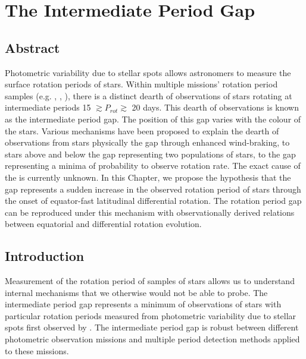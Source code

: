 \chapter{The Intermediate Period Gap}
\label{chap:period_gap}

\section*{Abstract}


Photometric variability due to stellar spots allows astronomers to measure the surface rotation periods of stars.
Within multiple missions' rotation period samples (e.g. \kepler, \ktoo, \ZTF), there is a distinct dearth of observations of stars rotating at intermediate periods 15 $\gtrsim P_{rot} \gtrsim$ 20 days.
This dearth of observations is known as the intermediate period gap.
The position of this gap varies with the colour of the stars.
Various mechanisms have been proposed to explain the dearth of observations from stars physically  the gap through enhanced wind-braking, to stars above and below the gap representing two populations of stars, to the gap representing a minima of probability to observe rotation rate.
The exact cause of the  is currently unknown.
In this Chapter, we propose the hypothesis that the gap represents a sudden increase in the observed rotation period of stars through the onset of equator-fast latitudinal differential rotation.
The rotation period gap can be reproduced under this mechanism with observationally derived relations between equatorial and differential rotation evolution.

\newpage

\section{Introduction}
\label{sec:intro}

Measurement of the rotation period of samples of stars allows us to understand internal mechanisms that we otherwise would not be able to probe.
The intermediate period gap represents a minimum of observations of stars with particular rotation periods measured from photometric variability due to stellar spots first observed by \citet{mcquillan_rotation_2014}.
The intermediate period gap is robust between different photometric observation missions \citep{mcquillan_rotation_2014,davenport_rotating_2017,davenport_rotating_2018,lu_bridging_2022} and multiple period detection methods applied to these missions.

